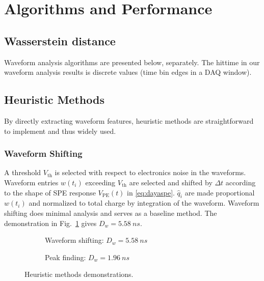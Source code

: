 \section{Algorithms and Performance} %
\label{sec:algorithm}

\subsection{Wasserstein distance}
\label{sec:W-dist}



Waveform analysis algorithms are presented below, separately. The hittime in our waveform analysis results is discrete values (time bin edges in a DAQ window). 

\subsection{Heuristic Methods}
By directly extracting waveform features, heuristic methods are straightforward to implement and thus widely used. 

\subsubsection{Waveform Shifting}
\label{sec:shifting}
A threshold $V_\mathrm{th}$ is selected with respect to electronics noise in the waveforms. Waveform entries $w(t_i)$ exceeding $V_\mathrm{th}$ are selected and shifted by $\Delta t$ according to the shape of SPE response $V_\mathrm{PE}(t)$ in \eqref{eq:dayaspe}. $\hat{q}_i$ are made proportional $w(t_i)$ and normalized to total charge by integration of the waveform.  Waveform shifting does minimal analysis and serves as a baseline method.  The demonstration in Fig.~\ref{fig:shifting} gives $D_w = \SI{5.58}{ns}$.

\begin{figure}[H]
  \begin{subfigure}{0.5\textwidth}
    \centering
    \scalebox{0.36}{}
    \caption{\label{fig:shifting}Waveform shifting: $D_w = \SI{5.58}{ns}$}
  \end{subfigure}
  \begin{subfigure}{0.5\textwidth}
    \centering
    \scalebox{0.36}{}
    \caption{\label{fig:peak}Peak finding: $D_w = \SI{1.96}{ns}$}
  \end{subfigure}
  \caption{Heuristic methods demonstrations.}
\end{figure}

